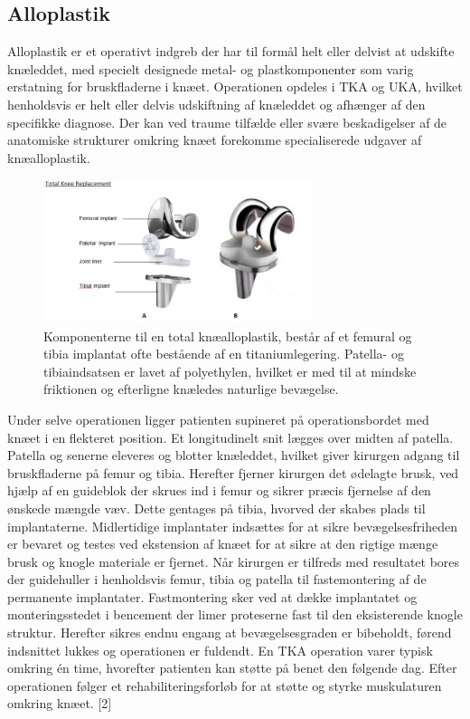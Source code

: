 \subsection{Alloplastik}
Alloplastik er et operativt indgreb der har til formål helt eller delvist at udskifte knæleddet, med specielt designede metal- og plastkomponenter som varig erstatning for bruskfladerne i knæet. Operationen opdeles i TKA og UKA, hvilket henholdsvis er helt eller delvis udskiftning af knæleddet og afhænger af den specifikke diagnose. Der kan ved traume tilfælde eller svære beskadigelser af de anatomiske strukturer omkring knæet forekomme specialiserede udgaver af knæalloplastik.

\begin{figure}[H] 
\begin{center}
\includegraphics[width=0.7\textwidth]{figures/tka_implant}
\end{center}
\caption{Komponenterne til en total knæalloplastik, består af et femural og tibia implantat ofte bestående af en titaniumlegering. Patella- og tibiaindsatsen er lavet af polyethylen, hvilket er med til at mindske friktionen og efterligne knæledes naturlige bevægelse.\cite{1}} 
\label{fig:tka_implant} 
\end{figure}

Under selve operationen ligger patienten supineret på operationsbordet med knæet i en flekteret position. Et longitudinelt snit lægges over midten af patella. Patella og senerne eleveres og blotter knæleddet, hvilket giver kirurgen adgang til bruskfladerne på femur og tibia. Herefter fjerner kirurgen det ødelagte brusk, ved hjælp af en guideblok der skrues ind i femur og sikrer præcis fjernelse af den ønskede mængde væv. Dette gentages på tibia, hvorved der skabes plads til implantaterne. Midlertidige implantater indsættes for at sikre bevægelsesfriheden er bevaret og testes ved ekstension af knæet for at sikre at den rigtige mænge brusk og knogle materiale er fjernet. Når kirurgen er tilfreds med resultatet bores der guidehuller i henholdsvis femur, tibia og patella til fastemontering af de permanente implantater. Fastmontering sker ved at dække implantatet og monteringsstedet i bencement der limer proteserne fast til den eksisterende knogle struktur. Herefter sikres endnu engang at bevægelsesgraden er bibeholdt, førend indsnittet lukkes og operationen er fuldendt. En TKA operation varer typisk omkring én time, hvorefter patienten kan støtte på benet den følgende dag. Efter operationen følger et rehabiliteringsforløb for at støtte og styrke muskulaturen omkring knæet. [2]

